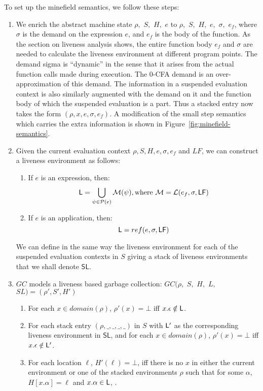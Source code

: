 \documentclass[9pt]{sigplanconf}
\begin{document}
To set up the minefield semantics, we follow these steps:
\begin{enumerate}
\item We enrich  the abstract machine state $\rho,$ $S,$  $ H,$ $e$ to
  $\rho,$ $S,$ $H,$ $e,$ $\sigma,$ $e_f$, where $\sigma$ is the demand
  on the expression $e$, and $e_f$ is the body of the function. As the
  section on liveness  analysis shows, the entire  function body $e_f$
  and $\sigma$  are needed  to calculate  the liveness  environment at
  different program  points. The  demand sigma  is ``dynamic''  in the
  sense  that it  arises from  the actual  function calls  made during
  execution.   The  0-CFA  demand  is an  over-approximation  of  this
  demand.  The information  in a suspended evaluation  context is also
  similarly augmented with  the demand on it and the  function body of
  which the suspended evaluation is a  part.  Thus a stacked entry now
  takes the  form $(\rho, x, e,  \sigma, e_f)$. A modification  of the
  small step semantics which carries the extra information is shown in
  Figure~\ref{fig:minefield-semantics}.
\item Given  the current  evaluation context $\rho,  S, H,  e, \sigma,
  e_f$ and $LF$, we can construct a liveness environment as follows:
  \begin{enumerate}
  \item If $e$ is an expression, then:  
  $$ \mathsf{L} = \bigcup_{\psi \in \mathcal{P}(e)} \mathcal{M}(\psi),
    \text{where }
  \mathcal{M} = \mathcal{L}(e_f, \sigma, \mathsf{LF})$$
\item If $e$ is an application, then:  
  $$ \mathsf{L} = ref(e, \sigma, \mathsf{LF})$$
  \end{enumerate}
We can define in the same way the liveness environment for each of the
suspended  evaluation contexts in  $S$  giving  a  stack of  liveness
environments that we shall denote $\mathsf{SL}$.
\item $GC$ models a liveness based garbage collection:
$GC(\rho,$ $ S,$ $ H,$ $ L,$ $ SL) = (\rho', S', H')$ 
  \begin{enumerate}
  \item For each $x \in domain(\rho)$,  $\rho'(x)=\bot$ iff $x.\epsilon
    \notin \mathsf{L}$.
\item For each stack entry $(\rho,\_,\_,\_,\_)$ in $S$ with $\mathsf{L}'$ as
  the corresponding liveness environment in $\mathsf{SL}$,  and for each $x
  \in domain(\rho)$,  $\rho'(x)=\bot$
  iff $x.\epsilon \notin \mathsf{L}'$.
\item For each location $\ell$, $H'(\ell) = \bot$, iff  there is no
  $x$ in either the current environment or one of the stacked
  environments $\rho$ such that for some $\alpha$, $H[x.\alpha] =
  \ell$  and $x.\alpha \in \mathsf{L}$, .
  \end{enumerate}
\end{enumerate}
\end{document}
